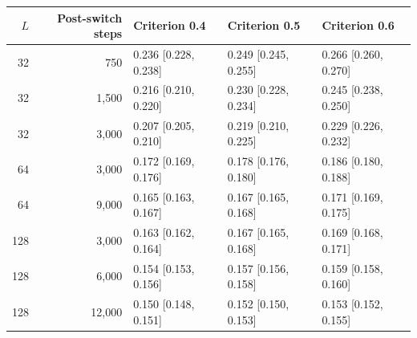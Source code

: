 \begin{center}
\begin{minipage}{\linewidth}\centering
\captionsetup{type=table,hypcap=false}
\caption{Changes in observation time and the required Sell fraction, with the technical traders kept in Hold, over 50 starting markets. Entries are interpolated $f_{50}$ [95\% seed-bootstrap interval] for each crossing criterion. The horizon grids are independent of adaptive refinement, so their interpolated values can differ slightly from Supplementary Table~\ref{tab:finite-size-scaling}.}
\label{tab:revision-horizons}
\footnotesize
\begin{tabular}{rrlll}
\toprule
$L$ & Post-switch steps & Criterion 0.4 & Criterion 0.5 & Criterion 0.6 \\
\midrule
32 & 750 & 0.236 [0.228, 0.238] & 0.249 [0.245, 0.255] & 0.266 [0.260, 0.270] \\
32 & 1{,}500 & 0.216 [0.210, 0.220] & 0.230 [0.228, 0.234] & 0.245 [0.238, 0.250] \\
32 & 3{,}000 & 0.207 [0.205, 0.210] & 0.219 [0.210, 0.225] & 0.229 [0.226, 0.232] \\
64 & 3{,}000 & 0.172 [0.169, 0.176] & 0.178 [0.176, 0.180] & 0.186 [0.180, 0.188] \\
64 & 9{,}000 & 0.165 [0.163, 0.167] & 0.167 [0.165, 0.168] & 0.171 [0.169, 0.175] \\
128 & 3{,}000 & 0.163 [0.162, 0.164] & 0.167 [0.165, 0.168] & 0.169 [0.168, 0.171] \\
128 & 6{,}000 & 0.154 [0.153, 0.156] & 0.157 [0.156, 0.158] & 0.159 [0.158, 0.160] \\
128 & 12{,}000 & 0.150 [0.148, 0.151] & 0.152 [0.150, 0.153] & 0.153 [0.152, 0.155] \\
\bottomrule
\end{tabular}
\end{minipage}
\end{center}


